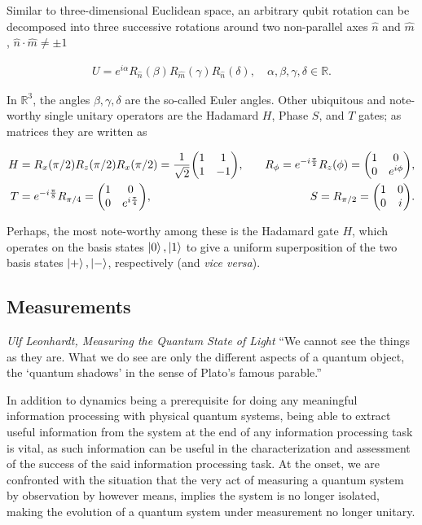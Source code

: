 \noindent
Similar to three-dimensional Euclidean space, an arbitrary qubit rotation can be decomposed into three successive rotations around two non-parallel axes $\hat{n}$ and $\hat{m}$, $\hat{n} \cdot \hat{m} \neq \pm 1$

\begin{align*}
	U = e^{i\alpha} R_{\hat{n}}(\beta)R_{\hat{m}}(\gamma)R_{\hat{n}}(\delta), \quad \alpha, \beta, \gamma, \delta \in \mathbb{R}.
\end{align*}

\noindent
In $\mathbb{R}^3$, the angles $\beta, \gamma, \delta$ are the so-called Euler angles. Other ubiquitous and note-worthy single unitary operators are the Hadamard $H$, Phase $S$, and $T$ gates; as matrices they are written as

\begin{align*}
	H &= R_{x}(\pi/2)R_{z}(\pi/2)R_x(\pi/2) = \frac{1}{\sqrt{2}}\mqty(1 & 1 \\ 1 & -1), &\quad R_{\phi} = e^{-i\frac{\pi}{2}}R_z(\phi) = \mqty(1 & 0 \\ 0 & e^{i\phi}), \\ 
	T &=  e^{-i\frac{\pi}{8}}R_{\pi/4} = \mqty(1 & 0 \\ 0 & e^{i\frac{\pi}{4}}), &\quad S = R_{\pi/2} = \mqty(1 & 0 \\ 0 & i).
\end{align*}

\noindent
Perhaps, the most note-worthy among these is the Hadamard gate $H$, which operates on the basis states $\ket{0}, \ket{1}$ to give a uniform superposition of the two basis states $\ket{+}, \ket{-}$, respectively (and \emph{vice versa}). 


\subsection{Measurements}
\begin{epigram}{\textit{Ulf Leonhardt, Measuring the Quantum State of Light}}
	\enquote{We cannot see the things as they are. What we do see are only the different aspects of a quantum object, the `quantum shadows' in the sense of Plato’s famous parable.}
\end{epigram}

\noindent
In addition to dynamics being a prerequisite for doing any meaningful information processing with physical quantum systems, being able to extract useful information from the system at the end of any information processing task is vital, as such information can be useful in the characterization and assessment of the success of the said information processing task. At the onset, we are confronted with the situation that the very act of measuring a quantum system by observation by however means, implies the system is no longer isolated, making the evolution of a quantum system under measurement no longer unitary.

